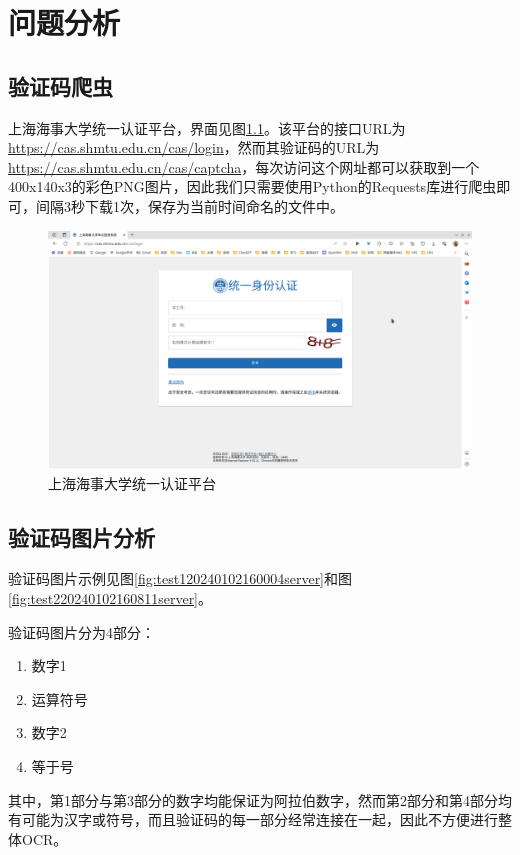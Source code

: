 \chapter{问题分析}
\label{chapter:2}

\section{验证码爬虫}

上海海事大学统一认证平台，界面见图\ref{fig:caswebpage}。该平台的接口URL为\url{https://cas.shmtu.edu.cn/cas/login}，然而其验证码的URL为\url{https://cas.shmtu.edu.cn/cas/captcha}，每次访问这个网址都可以获取到一个400x140x3的彩色PNG图片，因此我们只需要使用Python的Requests库进行爬虫即可，间隔3秒下载1次，保存为当前时间命名的文件中。

\begin{figure}
	\centering
	\includegraphics[width=0.9\linewidth]{Resources/Picture/cas_webpage}
	\caption{上海海事大学统一认证平台}
	\label{fig:caswebpage}
\end{figure}

\section{验证码图片分析}

验证码图片示例见图\ref{fig:test120240102160004server}和图\ref{fig:test220240102160811server}。

验证码图片分为4部分：

\begin{enumerate}
	\item 数字1
	\item 运算符号
	\item 数字2
	\item 等于号
\end{enumerate}

其中，第1部分与第3部分的数字均能保证为阿拉伯数字，然而第2部分和第4部分均有可能为汉字或符号，而且验证码的每一部分经常连接在一起，因此不方便进行整体OCR。

